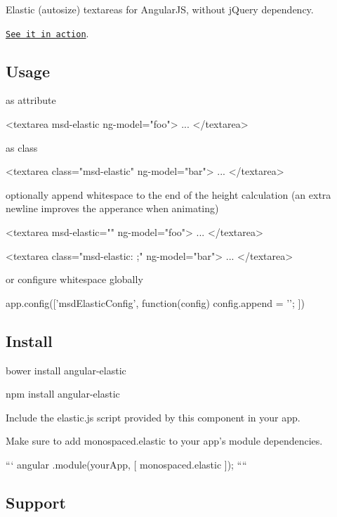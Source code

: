 Elastic (autosize) textareas for Angular\+JS, without j\+Query dependency.

\href{http://monospaced.github.io/angular-elastic}{\tt See it in action}.

\subsection*{Usage }

as attribute \begin{DoxyVerb}<textarea msd-elastic ng-model="foo">
  ...
</textarea>
\end{DoxyVerb}


as class \begin{DoxyVerb}<textarea class="msd-elastic" ng-model="bar">
  ...
</textarea>
\end{DoxyVerb}


optionally append whitespace to the end of the height calculation (an extra newline improves the apperance when animating) \begin{DoxyVerb}<textarea msd-elastic="\n" ng-model="foo">
  ...
</textarea>

<textarea class="msd-elastic: \n;" ng-model="bar">
  ...
</textarea>
\end{DoxyVerb}


or configure whitespace globally \begin{DoxyVerb}app.config(['msdElasticConfig', function(config) {
  config.append = '\n\n';
}])
\end{DoxyVerb}


\subsection*{Install }

\begin{DoxyVerb}bower install angular-elastic

npm install angular-elastic
\end{DoxyVerb}


Include the {\ttfamily elastic.\+js} script provided by this component in your app.

Make sure to add {\ttfamily monospaced.\+elastic} to your app’s module dependencies.

``` angular .module(\textquotesingle{}your\+App\textquotesingle{}, \mbox{[} \textquotesingle{}monospaced.\+elastic\textquotesingle{} \mbox{]}); ````

\subsection*{Support }

